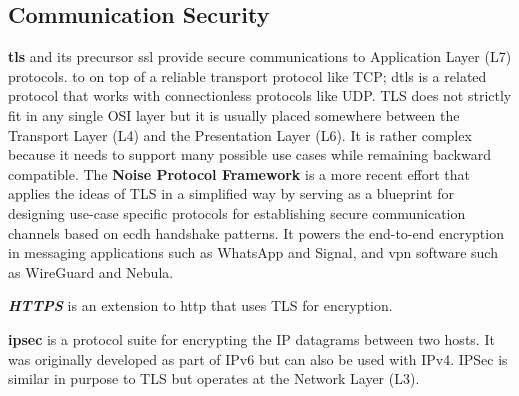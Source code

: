 \hypertarget{communication-security}{%
\subsection{Communication Security}\label{communication-security}}

\textbf{\acrfull{tls}} and its precursor \gls{ssl} provide secure
communications to Application Layer (L7) protocols. to on top of a
reliable transport protocol like TCP; \gls{dtls} is a related protocol
that works with connectionless protocols like UDP. TLS does not strictly
fit in any single OSI layer but it is usually placed somewhere between
the Transport Layer (L4) and the Presentation Layer (L6). It is rather
complex because it needs to support many possible use cases while
remaining backward compatible. 
The \textbf{Noise Protocol Framework} \autocite{noiseDocs} is a more
 recent effort that applies the
ideas of TLS in a simplified way by serving as a blueprint for designing
use-case specific protocols for establishing secure communication
channels based on \gls{ecdh} handshake patterns. It powers the
end-to-end encryption in messaging applications such as WhatsApp and
Signal, and \gls{vpn} software such as WireGuard and Nebula.

\textbf{\emph{HTTPS}} is an extension to \gls{http} that uses TLS for
encryption.


\textbf{\acrfull{ipsec}} is a protocol suite for encrypting the IP
datagrams between two hosts. It was originally developed as part of IPv6
but can also be used with IPv4. IPSec is similar in purpose to TLS but
operates at the Network Layer (L3).




